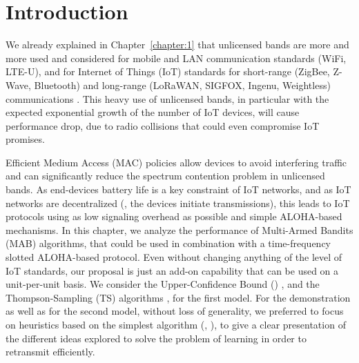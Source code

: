 \section{Introduction}
\label{sec:4:motivations}

We already explained in Chapter~\ref{chapter:1} that
unlicensed bands are more and more used and considered for mobile and LAN communication standards (WiFi, LTE-U), and for Internet of Things (IoT) standards for short-range (ZigBee, Z-Wave, Bluetooth) and long-range (LoRaWAN, SIGFOX, Ingenu, Weightless) communications \cite{Centenaro16}.
This heavy use of unlicensed bands, in particular with the expected exponential growth of the number of IoT devices, will cause performance drop, due to radio collisions that could even compromise IoT promises.

Efficient Medium Access (MAC) policies allow devices to avoid interfering traffic and can significantly reduce the spectrum contention problem in unlicensed bands.
As end-devices battery life is a key constraint of IoT networks,
and as IoT networks are decentralized (\ie, the devices initiate transmissions),
this leads to IoT protocols using as low signaling overhead as possible and simple ALOHA-based mechanisms.
%
In this chapter, we analyze the performance of Multi-Armed Bandits (MAB) algorithms, that could be used in combination with a time-frequency slotted ALOHA-based protocol.
Even without changing anything of the level of IoT standards, our proposal is just an add-on capability that can be used on a unit-per-unit basis.
We consider the Upper-Confidence Bound (\UCB) \cite{Auer02}, and the Thompson-Sampling (TS) algorithms \cite{Thompson33,AgrawalGoyal11,
Kaufmann12Thompson}, for the first model. For the demonstration as well as for the second model, without loss of generality, we preferred to focus on heuristics based on the simplest algorithm (\ie, \UCB), to give a clear presentation of the different ideas explored to solve the problem of learning in order to retransmit efficiently.

